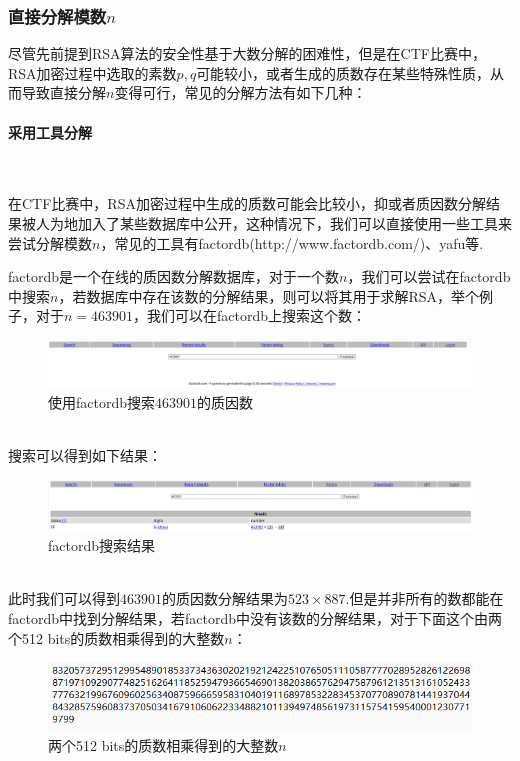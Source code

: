 \documentclass{article}
\numberwithin{equation}{subsubsection}
\begin{document}
\subsubsection{直接分解模数$n$}
尽管先前提到RSA算法的安全性基于大数分解的困难性，但是在CTF比赛中，RSA加密过程中选取的素数$p,q$可能较小，或者生成的质数存在某些特殊性质，从而导致直接分解$n$变得可行，常见的分解方法有如下几种：
\paragraph{采用工具分解}\

在CTF比赛中，RSA加密过程中生成的质数可能会比较小，抑或者质因数分解结果被人为地加入了某些数据库中公开，这种情况下，我们可以直接使用一些工具来尝试分解模数$n$，常见的工具有factordb(http://www.factordb.com/)、yafu等.\par
factordb是一个在线的质因数分解数据库，对于一个数$n$，我们可以尝试在factordb中搜索$n$，若数据库中存在该数的分解结果，则可以将其用于求解RSA，举个例子，对于$n=463901$，我们可以在factordb上搜索这个数：\\
\begin{figure}[h]
    \centering
    \includegraphics[width=1\textwidth]{Picture/factordb_search.png}
    \caption{使用factordb搜索$463901$的质因数}
\end{figure}\\
搜索可以得到如下结果：\\
\begin{figure}[h]
    \centering
    \includegraphics[width=1\textwidth]{Picture/factordb_result.png}
    \caption{factordb搜索结果}
\end{figure}\\
此时我们可以得到$463901$的质因数分解结果为$523\times 887$.但是并非所有的数都能在factordb中找到分解结果，若factordb中没有该数的分解结果，对于下面这个由两个512 bits的质数相乘得到的大整数$n$：\\
\begin{figure}[h]
    \centering
    \includegraphics[width=1\textwidth]{Picture/ABigNumber.png}
    \caption{两个512 bits的质数相乘得到的大整数$n$}
\end{figure}\\
\end{document}
